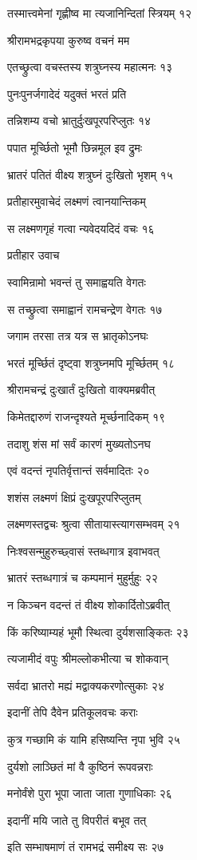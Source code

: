 तस्मात्त्वमेनां गृह्णीष्व मा त्यजानिन्दितां स्त्रियम् १२

श्रीरामभद्रकृपया कुरुष्व वचनं मम

एतच्छ्रुत्वा वचस्तस्य शत्रुघ्नस्य महात्मनः १३

पुनःपुनर्जगादेदं यदुक्तं भरतं प्रति

तन्निशम्य वचो भ्रातुर्दुःखपूरपरिप्लुतः १४

पपात मूर्च्छितो भूमौ छिन्नमूल इव द्रुमः

भ्रातरं पतितं वीक्ष्य शत्रुघ्नं दुःखितो भृशम् १५

प्रतीहारमुवाचेदं लक्ष्मणं त्वानयान्तिकम्

स लक्ष्मणगृहं गत्वा न्यवेदयदिदं वचः १६

प्रतीहार उवाच

स्वामिन्रामो भवन्तं तु समाह्वयति वेगतः

स तच्छ्रुत्वा समाह्वानं रामचन्द्रेण वेगतः १७

जगाम तरसा तत्र यत्र स भ्रातृकोऽनघः

भरतं मूर्च्छितं दृष्ट्वा शत्रुघ्नमपि मूर्च्छितम् १८

श्रीरामचन्द्रं दुःखार्तं दुःखितो वाक्यमब्रवीत्

किमेतद्दारुणं राजन्दृश्यते मूर्च्छनादिकम् १९

तदाशु शंस मां सर्वं कारणं मुख्यतोऽनघ

एवं वदन्तं नृपतिर्वृत्तान्तं सर्वमादितः २०

शशंस लक्ष्मणं क्षिप्रं दुःखपूरपरिप्लुतम्

लक्ष्मणस्तद्वचः श्रुत्वा सीतायास्त्यागसम्भवम् २१

निःश्वसन्मुहुरुच्छ्वासं स्तब्धगात्र इवाभवत्

भ्रातरं स्तब्धगात्रं च कम्पमानं मुहुर्मुहुः २२

न किञ्चन वदन्तं तं वीक्ष्य शोकार्दितोऽब्रवीत्

किं करिष्याम्यहं भूमौ स्थित्वा दुर्यशसाङ्कितः २३

त्यजामीदं वपुः श्रीमल्लोकभीत्या च शोकवान्

सर्वदा भ्रातरो मह्यं मद्वाक्यकरणोत्सुकाः २४

इदानीं तेपि दैवेन प्रतिकूलवचः कराः

कुत्र गच्छामि कं यामि हसिष्यन्ति नृपा भुवि २५

दुर्यशो लाञ्छितं मां वै कुष्ठिनं रूपवन्नराः

मनोर्वंशे पुरा भूपा जाता जाता गुणाधिकाः २६

इदानीं मयि जाते तु विपरीतं बभूव तत्

इति सम्भाषमाणं तं रामभद्रं समीक्ष्य सः २७

